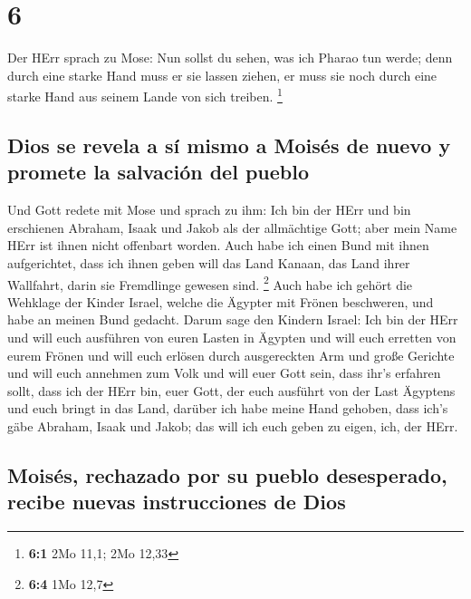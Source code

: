 \hypertarget{section-5}{%
\section{6}\label{section-5}}

 Der HErr sprach zu Mose: Nun sollst du sehen, was ich
Pharao tun werde; denn durch eine starke Hand muss er sie lassen ziehen,
er muss sie noch durch eine starke Hand aus seinem Lande von sich
treiben. \footnote{\textbf{6:1} 2Mo 11,1; 2Mo 12,33}

\hypertarget{dios-se-revela-a-suxed-mismo-a-moisuxe9s-de-nuevo-y-promete-la-salvaciuxf3n-del-pueblo}{%
\subsection{Dios se revela a sí mismo a Moisés de nuevo y promete la
salvación del
pueblo}\label{dios-se-revela-a-suxed-mismo-a-moisuxe9s-de-nuevo-y-promete-la-salvaciuxf3n-del-pueblo}}

 Und Gott redete mit Mose und sprach zu ihm: Ich bin der
HErr  und bin erschienen Abraham, Isaak und Jakob als der
allmächtige Gott; aber mein Name HErr ist ihnen nicht offenbart worden.
 Auch habe ich einen Bund mit ihnen aufgerichtet, dass ich
ihnen geben will das Land Kanaan, das Land ihrer Wallfahrt, darin sie
Fremdlinge gewesen sind. \footnote{\textbf{6:4} 1Mo 12,7} 
Auch habe ich gehört die Wehklage der Kinder Israel, welche die Ägypter
mit Frönen beschweren, und habe an meinen Bund gedacht. 
Darum sage den Kindern Israel: Ich bin der HErr und will euch ausführen
von euren Lasten in Ägypten und will euch erretten von eurem Frönen und
will euch erlösen durch ausgereckten Arm und große Gerichte
 und will euch annehmen zum Volk und will euer Gott sein,
dass ihr's erfahren sollt, dass ich der HErr bin, euer Gott, der euch
ausführt von der Last Ägyptens  und euch bringt in das
Land, darüber ich habe meine Hand gehoben, dass ich's gäbe Abraham,
Isaak und Jakob; das will ich euch geben zu eigen, ich, der HErr.

\hypertarget{moisuxe9s-rechazado-por-su-pueblo-desesperado-recibe-nuevas-instrucciones-de-dios}{%
\subsection{Moisés, rechazado por su pueblo desesperado, recibe nuevas
instrucciones de
Dios}\label{moisuxe9s-rechazado-por-su-pueblo-desesperado-recibe-nuevas-instrucciones-de-dios}}

